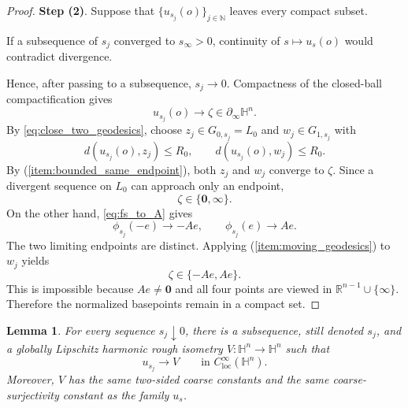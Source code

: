 \documentclass[11pt]{amsart}
\theoremstyle{plain}
\newtheorem{lemma}[theorem]{Lemma}
\theoremstyle{plain}
\theoremstyle{plain}
\newcommand{\Hn}{\mathbb H^n}
\newcommand{\R}{\mathbb R}
\numberwithin{equation}{section}
\begin{document}
\begin{proof}
\textbf{Step (2)}. Suppose that \(\{u_{s_j}(o)\}_{j\in\mathbb N}\) leaves every compact subset.  

If a subsequence
of \(s_j\) converged to \(s_\infty>0\), continuity of
\(s\mapsto u_s(o)\) would contradict divergence.  

Hence, after passing to
a subsequence, \(s_j\to0\).  Compactness of the closed-ball
compactification gives
\[
u_{s_j}(o)\longrightarrow\zeta
\in\partial_\infty\Hn.
\]
By \eqref{eq:close_two_geodesics}, choose
\(z_j\in G_{0,s_j}=L_0\) and \(w_j\in G_{1,s_j}\) with
\[
d(u_{s_j}(o),z_j)\leq R_0,
\qquad
d(u_{s_j}(o),w_j)\leq R_0.
\]
By (\ref{item:bounded_same_endpoint}), both
\(z_j\) and \(w_j\) converge to \(\zeta\).  Since a divergent sequence
on \(L_0\) can approach only an endpoint,
\[
\zeta\in\{\mathbf{0},\infty\}.
\]
On the other hand, \eqref{eq:fs_to_A} gives
\[
\phi_{s_j}(-e)\to-Ae,
\qquad
\phi_{s_j}(e)\to Ae.
\]
The two limiting endpoints are distinct.  Applying
(\ref{item:moving_geodesics}) to \(w_j\) yields
\[
\zeta\in\{-Ae,Ae\}.
\]
This is impossible because
\(Ae\neq\mathbf{0}\) and all four points are viewed in
\(\R^{n-1}\cup\{\infty\}\).  Therefore the normalized basepoints remain in
a compact set.
\end{proof}

\begin{lemma}\label{lem:Us_compactness}
For every sequence \(s_j\downarrow0\), there is a subsequence, still
denoted \(s_j\), and a globally Lipschitz harmonic rough isometry
$
V:\Hn\longrightarrow\Hn$ such that
\[
u_{s_j}\longrightarrow V
\qquad\text{in }C^\infty_{\mathrm{loc}}(\mathbb{H}^n).
\]
Moreover, $V$ has the same two-sided coarse constants and the same
coarse-surjectivity constant as the family \(u_s\).
\end{lemma}
\end{document}
